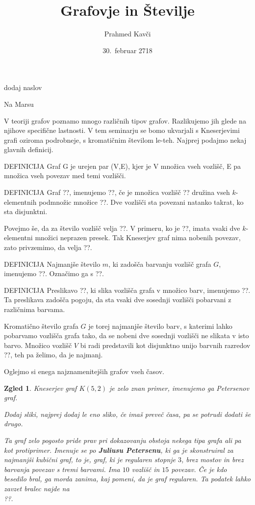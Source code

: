 \documentclass[a4paper,12pt]{article}
\title{Grafovje in Številje}
\author{Prahmed Kavči}
\date{30.\ februar 2718}
\newtheorem{zgled}{Zgled}
\begin{document}
 
dodaj naslov


Na Marsu

V teoriji grafov poznamo mnogo različnih tipov grafov. Razlikujemo jih glede na njihove specifične lastnosti. V tem seminarju se bomo ukvarjali s Kneserjevimi grafi oziroma podrobneje, s kromatičnim številom le-teh. Najprej podajmo nekaj glavnih definicij.


DEFINICIJA
Graf G je urejen par (V,E), kjer je V množica vseh vozlišč, E pa množica vseh povezav med temi vozlišči.

DEFINICIJA
Graf ??, imenujemo ??, če je množica vozlišč ?? družina vseh $k$-elementnih podmnožic množice ??. Dve vozlišči sta povezani natanko takrat, ko sta disjunktni. 


Povejmo še, da za število vozlišč velja ??. V primeru, ko je ??, imata vsaki dve $k$-elementni množici neprazen presek. Tak Kneserjev graf nima nobenih povezav, zato privzemimo, da velja ??.

DEFINICIJA
Najmanjše število $m$, ki zadošča barvanju vozlišč grafa $G$, imenujemo ??. Označimo ga s ??.

DEFINICIJA
Preslikavo ??, ki slika vozlišča grafa v množico barv, imenujemo ??. Ta preslikava zadošča pogoju, da sta vsaki dve sosednji vozlišči pobarvani z različnima barvama.


Kromatično število grafa $G$ je torej najmanjše število barv, s katerimi lahko pobarvamo vozlišča grafa tako, da se nobeni dve sosednji vozlišči ne slikata v isto barvo. Množico vozlišč $V$ bi radi predstavili kot disjunktno unijo barvnih razredov ??, teh pa želimo, da je najmanj.



Oglejmo si enega najznamenitejših grafov vseh časov.

\begin{zgled}{Kneserjev graf $K(5,2)$ je zelo znan primer, imenujemo ga Petersenov graf. 

Dodaj sliki, najprej dodaj le eno sliko, če imaš preveč časa, pa se potrudi dodati še drugo.

Ta graf zelo pogosto pride prav pri dokazovanju obstoja nekega tipa grafa ali pa kot protiprimer. Imenuje se po \textbf{Juliusu Petersenu}, ki ga je skonstruiral za najmanjši kubični graf, to je, graf, ki je regularen stopnje $3$, brez mostov in brez barvanja povezav s tremi barvami. Ima $10$ vozlišč in $15$ povezav. Če je kdo besedilo bral, ga morda zanima, kaj pomeni, da je graf regularen. Ta podatek lahko zavzet bralec najde na \\ 
??.
}
\end{zgled}
\end{document}
